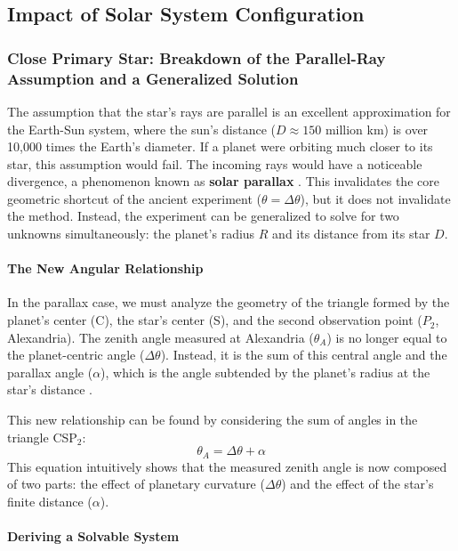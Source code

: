 \documentclass[11pt]{article}
\begin{document}
\subsection{Impact of Solar System Configuration}

\subsubsection{Close Primary Star: Breakdown of the Parallel-Ray Assumption and a Generalized Solution}
\label{sec:parallax}

The assumption that the star’s rays are parallel is an excellent approximation for the Earth-Sun system, where the sun’s distance ($D \approx 150$ million km) is over 10,000 times the Earth’s diameter. If a planet were orbiting much closer to its star, this assumption would fail. The incoming rays would have a noticeable divergence, a phenomenon known as \textbf{solar parallax} \cite{Smart1977, Urban2013}. This invalidates the core geometric shortcut of the ancient experiment ($\theta = \Delta\theta$), but it does not invalidate the method. Instead, the experiment can be generalized to solve for two unknowns simultaneously: the planet’s radius $R$ and its distance from its star $D$.

\paragraph{The New Angular Relationship}

In the parallax case, we must analyze the geometry of the triangle formed by the planet's center (C), the star's center (S), and the second observation point ($P_2$, Alexandria). The zenith angle measured at Alexandria ($\theta_A$) is no longer equal to the planet-centric angle ($\Delta\theta$). Instead, it is the sum of this central angle and the parallax angle ($\alpha$), which is the angle subtended by the planet's radius at the star's distance \cite{Woolf1959}.

This new relationship can be found by considering the sum of angles in the triangle CSP$_2$:
\begin{equation}
\theta_A = \Delta\theta + \alpha
\label{eq:parallax_angle}
\end{equation}
This equation intuitively shows that the measured zenith angle is now composed of two parts: the effect of planetary curvature ($\Delta\theta$) and the effect of the star's finite distance ($\alpha$).

\paragraph{Deriving a Solvable System}
\end{document}
